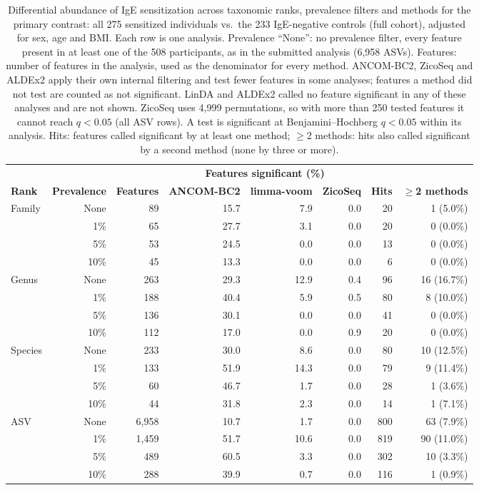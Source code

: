 \begin{table}[h!]
\centering
\footnotesize
\setlength{\tabcolsep}{2.5pt}
\begin{tabular}{l r r r r r r r}
 & & & \multicolumn{3}{c}{\textbf{Features significant (\%)}} & & \\
\textbf{Rank} & \textbf{Prevalence} & \textbf{Features} & \textbf{ANCOM-BC2} & \textbf{limma-voom} & \textbf{ZicoSeq} & \textbf{Hits} & \textbf{$\geq$2 methods} \\
\hline
Family & None & 89 & 15.7 & 7.9 & 0.0 & 20 & 1 (5.0\%) \\
 & 1\% & 65 & 27.7 & 3.1 & 0.0 & 20 & 0 (0.0\%) \\
 & 5\% & 53 & 24.5 & 0.0 & 0.0 & 13 & 0 (0.0\%) \\
 & 10\% & 45 & 13.3 & 0.0 & 0.0 & 6 & 0 (0.0\%) \\
\hline
Genus & None & 263 & 29.3 & 12.9 & 0.4 & 96 & 16 (16.7\%) \\
 & 1\% & 188 & 40.4 & 5.9 & 0.5 & 80 & 8 (10.0\%) \\
 & 5\% & 136 & 30.1 & 0.0 & 0.0 & 41 & 0 (0.0\%) \\
 & 10\% & 112 & 17.0 & 0.0 & 0.9 & 20 & 0 (0.0\%) \\
\hline
Species & None & 233 & 30.0 & 8.6 & 0.0 & 80 & 10 (12.5\%) \\
 & 1\% & 133 & 51.9 & 14.3 & 0.0 & 79 & 9 (11.4\%) \\
 & 5\% & 60 & 46.7 & 1.7 & 0.0 & 28 & 1 (3.6\%) \\
 & 10\% & 44 & 31.8 & 2.3 & 0.0 & 14 & 1 (7.1\%) \\
\hline
ASV & None & 6,958 & 10.7 & 1.7 & 0.0 & 800 & 63 (7.9\%) \\
 & 1\% & 1,459 & 51.7 & 10.6 & 0.0 & 819 & 90 (11.0\%) \\
 & 5\% & 489 & 60.5 & 3.3 & 0.0 & 302 & 10 (3.3\%) \\
 & 10\% & 288 & 39.9 & 0.7 & 0.0 & 116 & 1 (0.9\%) \\
\hline
\end{tabular}
\caption{Differential abundance of IgE sensitization across taxonomic ranks, prevalence filters and methods for the primary contrast: all 275 sensitized individuals vs.\ the 233 IgE-negative controls (full cohort), adjusted for sex, age and BMI. Each row is one analysis. Prevalence ``None'': no prevalence filter, every feature present in at least one of the 508 participants, as in the submitted analysis (6,958 ASVs). Features: number of features in the analysis, used as the denominator for every method. ANCOM-BC2, ZicoSeq and ALDEx2 apply their own internal filtering and test fewer features in some analyses; features a method did not test are counted as not significant. LinDA and ALDEx2 called no feature significant in any of these analyses and are not shown. ZicoSeq uses 4,999 permutations, so with more than 250 tested features it cannot reach $q < 0.05$ (all ASV rows). A test is significant at Benjamini--Hochberg $q < 0.05$ within its analysis. Hits: features called significant by at least one method; $\geq$2 methods: hits also called significant by a second method (none by three or more).\label{tab:da_ranks_primary}}
\end{table}
